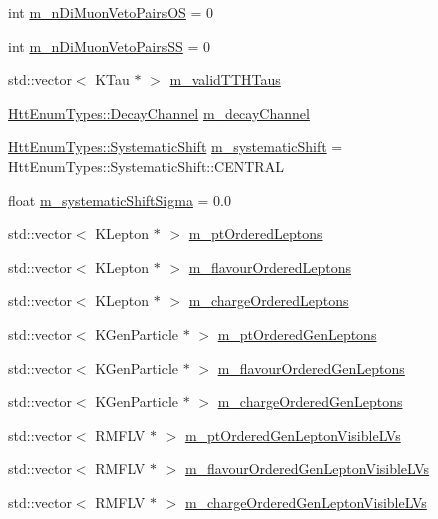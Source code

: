 \begin{DoxyCompactItemize}
int \hyperlink{classHttProduct_a451eb95711c40e4c210c2a5850e1b89d}{m\_\-nDiMuonVetoPairsOS} = 0
\item 
int \hyperlink{classHttProduct_a68e6a6fd20b591ca502d71f412d45a3f}{m\_\-nDiMuonVetoPairsSS} = 0
\item 
std::vector$<$ KTau $\ast$ $>$ \hyperlink{classHttProduct_a42f077b59a010e311381923b680bd2c2}{m\_\-validTTHTaus}
\item 
\hyperlink{classHttEnumTypes_a5e7e80b023df2c06dfd1e9c08f6efb35}{HttEnumTypes::DecayChannel} \hyperlink{classHttProduct_ab1216927e208e9ad29a1e84d253ef03d}{m\_\-decayChannel}
\item 
\hyperlink{classHttEnumTypes_a09f53466ade8cb436d340aedf88ab0c2}{HttEnumTypes::SystematicShift} \hyperlink{classHttProduct_ad96ec3ff0504af461f0e71ed57853ef7}{m\_\-systematicShift} = HttEnumTypes::SystematicShift::CENTRAL
\item 
float \hyperlink{classHttProduct_a5d765e15fd61df93b581ac259fffa8bc}{m\_\-systematicShiftSigma} = 0.0
\item 
std::vector$<$ KLepton $\ast$ $>$ \hyperlink{classHttProduct_accc7dc9b7ee8356d0163149738aa933b}{m\_\-ptOrderedLeptons}
\item 
std::vector$<$ KLepton $\ast$ $>$ \hyperlink{classHttProduct_af914b7dae638ccd70a9f3fd33a39ebb1}{m\_\-flavourOrderedLeptons}
\item 
std::vector$<$ KLepton $\ast$ $>$ \hyperlink{classHttProduct_ab6f4f492a592b34911ad317378b72f1b}{m\_\-chargeOrderedLeptons}
\item 
std::vector$<$ KGenParticle $\ast$ $>$ \hyperlink{classHttProduct_aeed3fd71b9606c0d2a4d8da8500e510a}{m\_\-ptOrderedGenLeptons}
\item 
std::vector$<$ KGenParticle $\ast$ $>$ \hyperlink{classHttProduct_a18eca3b916d8a8824d92200c957e7ac9}{m\_\-flavourOrderedGenLeptons}
\item 
std::vector$<$ KGenParticle $\ast$ $>$ \hyperlink{classHttProduct_a70bf9c026bb6be12a25a0e793215511f}{m\_\-chargeOrderedGenLeptons}
\item 
std::vector$<$ RMFLV $\ast$ $>$ \hyperlink{classHttProduct_aeea816c374d3c6bc8627b18a82830485}{m\_\-ptOrderedGenLeptonVisibleLVs}
\item 
std::vector$<$ RMFLV $\ast$ $>$ \hyperlink{classHttProduct_a8ba976173e7b164b171a5cb19fce4d77}{m\_\-flavourOrderedGenLeptonVisibleLVs}
\item 
std::vector$<$ RMFLV $\ast$ $>$ \hyperlink{classHttProduct_a736650de11728388126970486f2f4417}{m\_\-chargeOrderedGenLeptonVisibleLVs}

\end{DoxyCompactItemize}
